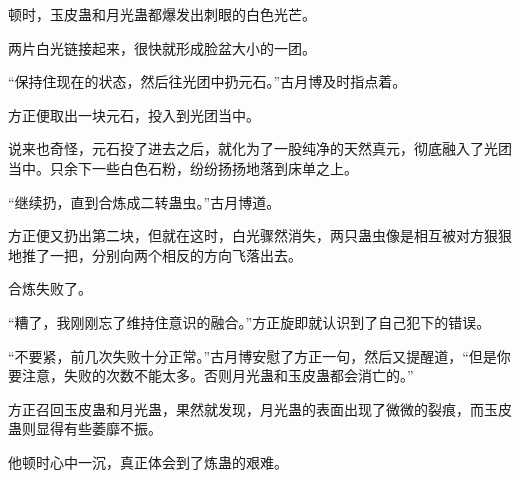 \begin{this_body}
顿时，玉皮蛊和月光蛊都爆发出刺眼的白色光芒。

两片白光链接起来，很快就形成脸盆大小的一团。

“保持住现在的状态，然后往光团中扔元石。”古月博及时指点着。

方正便取出一块元石，投入到光团当中。

说来也奇怪，元石投了进去之后，就化为了一股纯净的天然真元，彻底融入了光团当中。只余下一些白色石粉，纷纷扬扬地落到床单之上。

“继续扔，直到合炼成二转蛊虫。”古月博道。

方正便又扔出第二块，但就在这时，白光骤然消失，两只蛊虫像是相互被对方狠狠地推了一把，分别向两个相反的方向飞落出去。

合炼失败了。

“糟了，我刚刚忘了维持住意识的融合。”方正旋即就认识到了自己犯下的错误。

“不要紧，前几次失败十分正常。”古月博安慰了方正一句，然后又提醒道，“但是你要注意，失败的次数不能太多。否则月光蛊和玉皮蛊都会消亡的。”

方正召回玉皮蛊和月光蛊，果然就发现，月光蛊的表面出现了微微的裂痕，而玉皮蛊则显得有些萎靡不振。

他顿时心中一沉，真正体会到了炼蛊的艰难。

\end{this_body}


